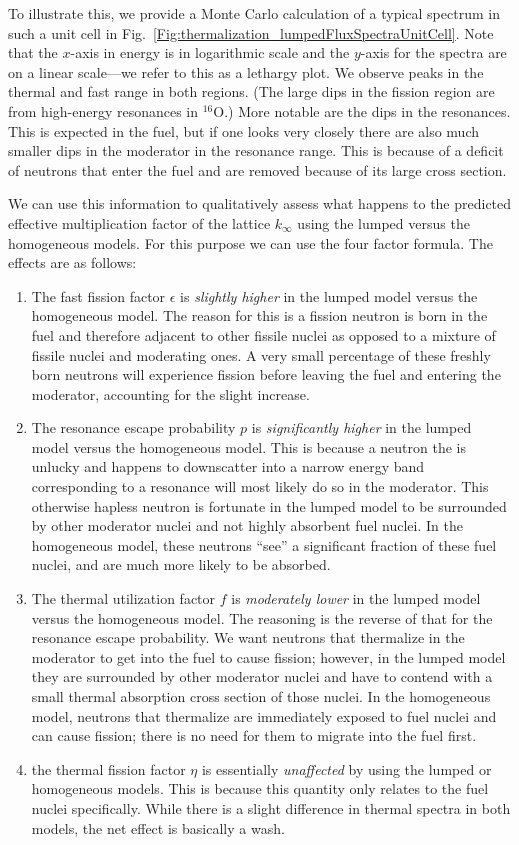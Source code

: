 To illustrate this, we provide a Monte Carlo calculation of a typical spectrum in such a unit cell in Fig.~\ref{Fig:thermalization_lumpedFluxSpectraUnitCell}. Note that the $x$-axis in energy is in logarithmic scale and the $y$-axis for the spectra are on a linear scale---we refer to this as a lethargy plot. We observe peaks in the thermal and fast range in both regions. (The large dips in the fission region are from high-energy resonances in $^{16}$O.) More notable are the dips in the resonances. This is expected in the fuel, but if one looks very closely there are also much smaller dips in the moderator in the resonance range. This is because of a deficit of neutrons that enter the fuel and are removed because of its large cross section.

We can use this information to qualitatively assess what happens to the predicted effective multiplication factor of the lattice $k_\infty$ using the lumped versus the homogeneous models. For this purpose we can use the four factor formula. The effects are as follows:
\begin{enumerate}
  \item The fast fission factor $\epsilon$ is \emph{slightly higher} in the lumped model versus the homogeneous model. The reason for this is a fission neutron is born in the fuel and therefore adjacent to other fissile nuclei as opposed to a mixture of fissile nuclei and moderating ones. A very small percentage of these freshly born neutrons will experience fission before leaving the fuel and entering the moderator, accounting for the slight increase.
  \item The resonance escape probability $p$ is \emph{significantly higher} in the lumped model versus the homogeneous model. This is because a neutron the is unlucky and happens to downscatter into a narrow energy band corresponding to a resonance will most likely do so in the moderator. This otherwise hapless neutron is fortunate in the lumped model to be surrounded by other moderator nuclei and not highly absorbent fuel nuclei. In the homogeneous model, these neutrons ``see'' a significant fraction of these fuel nuclei, and are much more likely to be absorbed.
  \item The thermal utilization factor $f$ is \emph{moderately lower} in the lumped model versus the homogeneous model. The reasoning is the reverse of that for the resonance escape probability. We want neutrons that thermalize in the moderator to get into the fuel to cause fission; however, in the lumped model they are surrounded by other moderator nuclei and have to contend with a small thermal absorption cross section of those nuclei. In the homogeneous model, neutrons that thermalize are immediately exposed to fuel nuclei and can cause fission; there is no need for them to migrate into the fuel first.
  \item the thermal fission factor $\eta$ is essentially \emph{unaffected} by using the lumped or homogeneous models. This is because this quantity only relates to the fuel nuclei specifically. While there is a slight difference in thermal spectra in both models, the net effect is basically a wash.
\end{enumerate}
